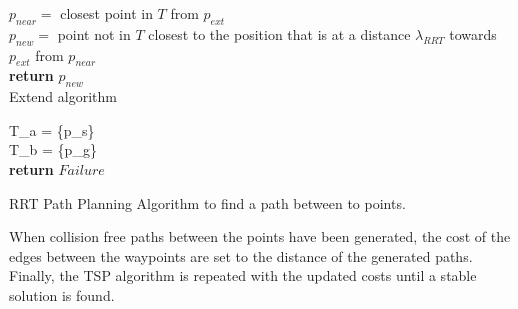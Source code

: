 \begin{algorithm}[H]
\SetAlgoLined
{}

\textup{$p_{near} =$ closest point in $T$ from $p_{ext}$}\\ 
\textup{$p_{new} =$ point not in $T$ closest to the position that is at a distance $\lambda_{RRT}$ towards $p_{ext}$ from $p_{near}$}\\ 
\textup{\textbf{return} $p_{new}$}\\

 \caption{Extend algorithm}
 \label{alg:extend}
\end{algorithm}

\begin{algorithm}[H]
\SetAlgoLined
{}

T_a = \{p_s\} \\
T_b = \{p_g\}  \\
\textup{\textbf{return} $Failure$}

 \caption{RRT Path Planning Algorithm to find a path between to points.}
 \label{alg:RRT}
\end{algorithm}

When collision free paths between the points have been generated, the cost of the edges between the waypoints are set to the distance of the generated paths. Finally, the TSP algorithm is repeated with the updated costs until a stable solution is found.

